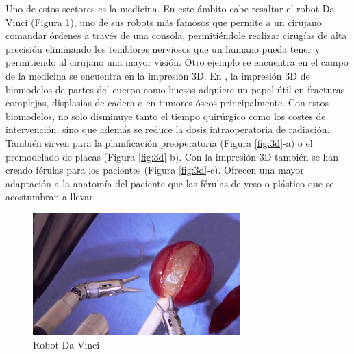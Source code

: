 Uno de estos sectores es la medicina. En este ámbito cabe resaltar el robot Da Vinci (Figura \ref{fig:da-vinci}), uno de sus robots más famosos que permite a un cirujano comandar órdenes a través de una consola, permitiéndole realizar cirugías de alta precisión eliminando los temblores nerviosos que un humano pueda tener y permitiendo al cirujano una mayor visión. Otro ejemplo se encuentra en el campo de la medicina se encuentra en la impresión 3D. En \cite{ANDRESCANO2021138}, la impresión 3D de biomodelos de partes del cuerpo como huesos adquiere un papel útil en fracturas complejas, displasias de cadera o en tumores óseos principalmente. Con estos biomodelos, no solo disminuye tanto el tiempo quirúrgico como los costes de intervención, sino que además se reduce la dosis intraoperatoria de radiación. También sirven para la planificación preoperatoria (Figura \ref{fig:3d}-a) o el premodelado de placas (Figura \ref{fig:3d}-b). Con la impresión 3D también se han creado férulas para los pacientes (Figura \ref{fig:3d}-c). Ofrecen una mayor adaptación a la anatomía del paciente que las férulas de yeso o plástico que se acostumbran a llevar.\\
\begin{figure} [h!]
  \begin{center}
    \includegraphics[width=8cm]{figs/da-vinci}
  \end{center}
  \caption{Robot Da Vinci}
  \label{fig:da-vinci}
\end{figure}

